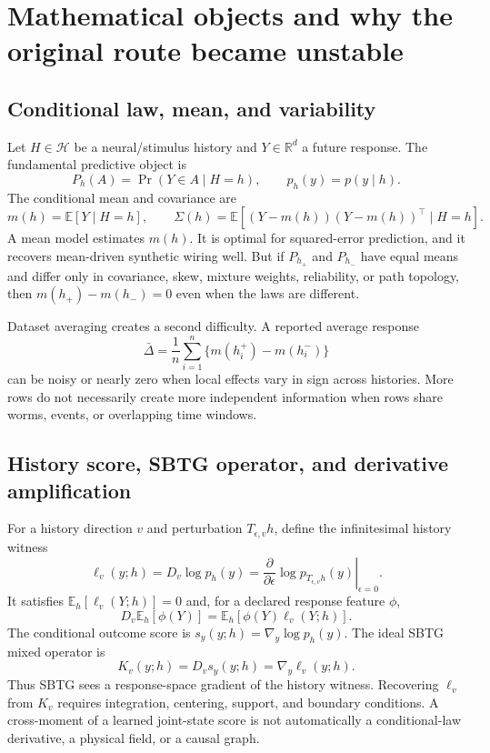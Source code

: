 \documentclass[10pt]{article}
\newcommand{\R}{\mathbb{R}}
\newcommand{\E}{\mathbb{E}}
\begin{document}
\section{Mathematical objects and why the original route became unstable}

\subsection{Conditional law, mean, and variability}

Let $H\in\mathcal H$ be a neural/stimulus history and $Y\in\R^d$ a future response. The fundamental predictive object is
\begin{equation}
 P_h(A)=\Pr(Y\in A\mid H=h), \qquad p_h(y)=p(y\mid h).
\end{equation}
The conditional mean and covariance are
\begin{equation}
 m(h)=\E[Y\mid H=h], \qquad \Sigma(h)=\E[(Y-m(h))(Y-m(h))^\top\mid H=h].
\end{equation}
A mean model estimates $m(h)$. It is optimal for squared-error prediction, and it recovers mean-driven synthetic wiring well. But if $P_{h_+}$ and $P_{h_-}$ have equal means and differ only in covariance, skew, mixture weights, reliability, or path topology, then $m(h_+)-m(h_-)=0$ even when the laws are different.

Dataset averaging creates a second difficulty. A reported average response
\begin{equation}
 \bar\Delta=\frac{1}{n}\sum_{i=1}^n\{m(h_i^+)-m(h_i^-)\}
\end{equation}
can be noisy or nearly zero when local effects vary in sign across histories. More rows do not necessarily create more independent information when rows share worms, events, or overlapping time windows.

\subsection{History score, SBTG operator, and derivative amplification}

For a history direction $v$ and perturbation $T_{\epsilon,v}h$, define the infinitesimal history witness
\begin{equation}
 \ell_v(y;h)=D_v\log p_h(y)=\left.\frac{\partial}{\partial\epsilon}\log p_{T_{\epsilon,v}h}(y)\right|_{\epsilon=0}.
\end{equation}
It satisfies $\E_h[\ell_v(Y;h)]=0$ and, for a declared response feature $\phi$,
\begin{equation}
 D_v\E_h[\phi(Y)]=\E_h[\phi(Y)\ell_v(Y;h)].
\end{equation}
The conditional outcome score is $s_y(y;h)=\nabla_y\log p_h(y)$. The ideal SBTG mixed operator is
\begin{equation}
 K_v(y;h)=D_v s_y(y;h)=\nabla_y\ell_v(y;h).
\end{equation}
Thus SBTG sees a response-space gradient of the history witness. Recovering $\ell_v$ from $K_v$ requires integration, centering, support, and boundary conditions. A cross-moment of a learned joint-state score is not automatically a conditional-law derivative, a physical field, or a causal graph.
\end{document}
